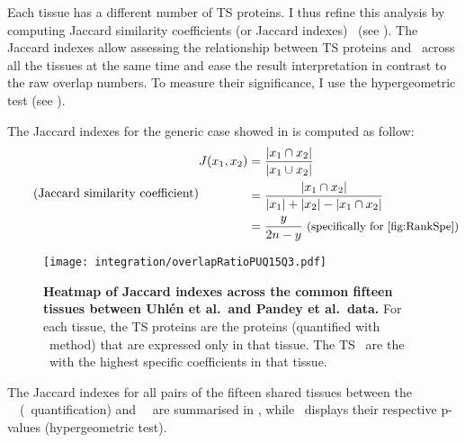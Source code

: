Each tissue has a different number of \gls{TS} proteins.
I thus refine this analysis
by computing Jaccard similarity coefficients
(or Jaccard indexes)~
(see ).
The Jaccard indexes allow assessing
the relationship between \gls{TS} proteins and \mRNAs\
across all the tissues at the same time
and ease the result interpretation in contrast to the raw overlap numbers.
To measure their significance,
I use the hypergeometric test (see ).

\begin{minipage}{\textwidth}
    The Jaccard indexes for the generic case showed in 
    is computed as follow:
\begin{equation}
    \tag{Jaccard similarity coefficient}\label{eq:Jaccard}
    \begin{split}
        J(x_{1},x_{2}) & = \frac{\left | x_{1}\cap  x_{2}\right |}%
                                {\left | x_{1}\cup  x_{2}\right |}\\
                       & = \frac{\left | x_{1}\cap  x_{2}\right |}%
                                {\left | x_{1} \right | + \left | x_{2} \right |%
                                - \left | x_{1}\cap  x_{2}\right |}\\
                                & = \frac{y}{2n-y} \text{\small{~(specifically
                                for~\Cref{fig:RankSpe})}}\\
    \end{split}
    \raisetag{6cm}
\end{equation}
\end{minipage}


\begin{figure}[!htb]
    \texttt{[image: integration/overlapRatioPUQ15Q3.pdf]}\centering
\caption[Heatmap of Jaccard indexes across 15 tissues]{%
\label{fig:JaccardIndexes}\label{fig:RatioJac}\textbf{Heatmap of Jaccard indexes
across the common fifteen tissues between Uhlén et al.\ and Pandey et al.\ data.}
For each tissue, the \gls{TS} proteins are the proteins
(quantified with \PPKM\ method) that are expressed only in that tissue.
The \gls{TS} \mRNAs\ are the \mRNAs\ with the highest specific coefficients
in that tissue.}
\end{figure}

The Jaccard indexes for all pairs of the fifteen shared tissues
between the \pandey\ \etal\ (\PPKM\ quantification) and \uhlen\ \etal\
are summarised in ,
while~\Cref{fig:JaccardPvalues} displays
their respective p-values (hypergeometric test).\\
\vspace{-\baselineskip}



